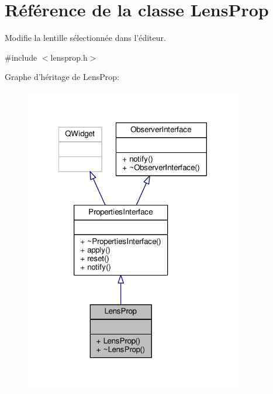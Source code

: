 \hypertarget{classLensProp}{\section{Référence de la classe Lens\+Prop}
\label{classLensProp}
}


Modifie la lentille sélectionnée dans l’éditeur.  




{\ttfamily \#include $<$lensprop.\+h$>$}



Graphe d'héritage de Lens\+Prop\+:
\nopagebreak
\begin{figure}[H]
\begin{center}
\leavevmode
\includegraphics[width=269pt]{d8/d9c/classLensProp__inherit__graph}
\end{center}
\end{figure}


